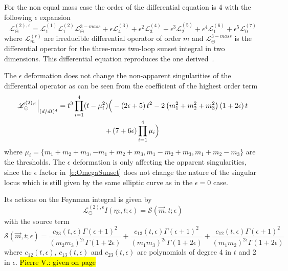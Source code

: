 \documentclass[a4paper,12pt]{article}
\numberwithin{equation}{section}
\numberwithin{figure}{section}
\def\su{\circleddash}
\newcommand{\pvnote}[1]{\sethlcolor{bubblegum} \protect\hl{Pierre V.: #1} \sethlcolor{yellow}}
\begin{document}
For the non equal mass case the order of the differential equation is
4 with the following $\epsilon$ expansion
\begin{equation}
     \mathscr{L}^{(2),\epsilon}_\su =   \mathscr{L}^{(1)}_1
     \mathscr{L}^{(2)}_1    \mathscr{L}^{3-mass}_\su +\epsilon
     \mathscr{L}^{(3)}_4+\epsilon^2  \mathscr{L}^{(4)}_3+\epsilon^3
     \mathscr{L}^{(5)}_2+ \epsilon^4 \mathscr{L}^{(6)}_1 +\epsilon^5
    \mathscr{L}^{(7)}_0
   \end{equation} 
   where $ \mathscr{L}^{(r)}_m$  are irreducible differential operator
   of  order $m$ and $\mathscr{L}^{3-mass}_\su$ is the differential
   operator for the three-mass two-loop sunset integral in two
   dimensions. This differential equation reproduces the one 
   derived~\cite{Remiddi:2013joa,Remiddi:2016gno}.

The $\epsilon$ deformation does not change the non-apparent
singularities of the differential operator as can be seen from the
coefficient of the highest order term
\begin{multline}
  \mathscr{L}^{(2),\epsilon}_\su \Big\vert_{(d/dt)^4}= t^3\prod_{i=1}^4 (t-
  \mu_i^2) \Big(-\left(2 \epsilon +5\right) t^{2}-2
    \left(m_{1}^{2}+m_{2}^{2}+m_{3}^{2}\right) \left(1+2 \epsilon
    \right) t \cr+ \left(7+6 \epsilon \right)\prod_{i=1}^4 \mu_i
\Big)  
\end{multline}
where $\mu_i=\{m_1+m_2+m_3,-m_1+m_2+m_3,m_1-m_2+m_3,m_1+m_2-m_3\}$ are
the thresholds.  The $\epsilon$ deformation is only affecting the
apparent singularities, since the $\epsilon$ factor
in~\eqref{e:OmegaSunset} does not change the nature of the singular
locus which is still given by the same elliptic curve as in the
$\epsilon=0$ case.
   
Its actions on the Feynman integral is given by 
\begin{equation}
     \mathscr{L}^{(2),\epsilon}_\su  I(\underline
     m,t;\epsilon)=\mathscr{S}(\vec m,t;\epsilon) 
   \end{equation}
   with the source term
   \begin{equation}
     \mathscr{S}(\vec m,t;\epsilon)=\frac{c_{23}(t,\epsilon)\Gamma (\epsilon +1)^2}{ (m_{2} m_{3})^{2 \epsilon}\Gamma (1+2\epsilon)}+\frac{c_{13}(t,\epsilon)\Gamma (\epsilon +1)^2}{ (m_{1} m_{3})^{2 \epsilon }\Gamma (1+2
   \epsilon)}+\frac{c_{12}(t,\epsilon)\Gamma (\epsilon +1)^2}{ (m_{1} m_{2})^{2 \epsilon }\Gamma (1+2
   \epsilon )}
\end{equation}
where $c_{12}(t,\epsilon)$, $c_{13}(t,\epsilon)$ and
$c_{23}(t,\epsilon)$ are polynomials of degree 4 in $t$ and 2 in
$\epsilon$. \pvnote{given on page}
\end{document}
